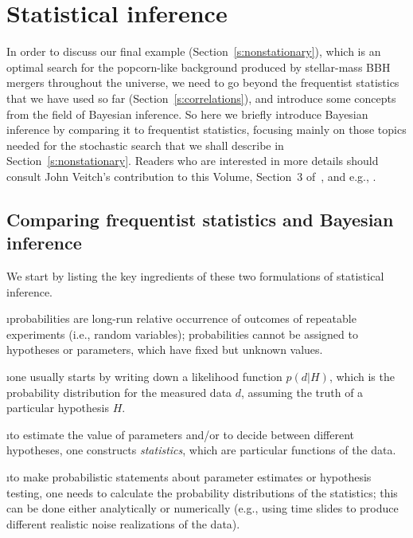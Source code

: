 \section{Statistical inference}
\label{s:statistical_inference}

In order to discuss our final example (Section~\ref{s:nonstationary}),
which is an optimal search for the popcorn-like background
produced by stellar-mass BBH mergers throughout the 
universe, we need to go beyond the frequentist 
statistics that we have used so far 
(Section~\ref{s:correlations}), 
and introduce some concepts from the field of Bayesian inference.
So here we briefly introduce Bayesian inference by comparing 
it to frequentist statistics, focusing mainly on those topics 
needed for the stochastic search that we shall describe in
Section~\ref{s:nonstationary}.
Readers who are interested in more details should 
consult John Veitch's contribution to this Volume,
Section~3 of~\cite{Romano-Cornish:2017}, and e.g.,
\cite{Gregory:2005}.

\subsection{Comparing frequentist statistics and Bayesian inference}

We start by listing the key ingredients of these two formulations 
of statistical inference.
\medskip


\bi

\i probabilities are long-run relative occurrence of 
outcomes of repeatable experiments (i.e., random variables);
probabilities cannot be assigned to hypotheses or parameters, 
which have fixed but unknown values.

\i one usually starts by writing down a likelihood 
function $p(d|H)$, which is the probability distribution 
for the measured data $d$, assuming the truth of a particular
hypothesis $H$.

\i to estimate the value of parameters and/or to decide
between different hypotheses, one constructs 
{\em statistics}, which are particular functions of the data.

\i to make probabilistic statements about 
parameter estimates or hypothesis testing, 
one needs to calculate
the probability distributions of the statistics;
this can be done either analytically or numerically 
(e.g., using time slides to produce different realistic
noise realizations of the data).

